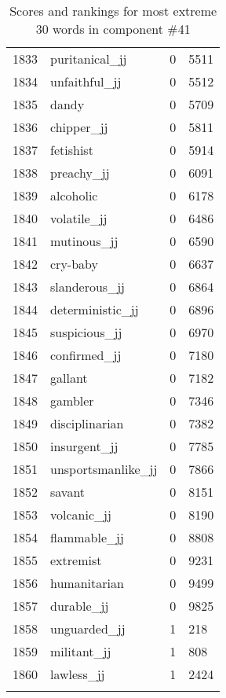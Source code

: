 \begin{longtable}[!htbp]{| rlr@{.}l |}
    1833 & puritanical\_jj & 0 & 5511 \\
    1834 & unfaithful\_jj & 0 & 5512 \\
    1835 & dandy & 0 & 5709 \\
    1836 & chipper\_jj & 0 & 5811 \\
    1837 & fetishist & 0 & 5914 \\
    1838 & preachy\_jj & 0 & 6091 \\
    1839 & alcoholic & 0 & 6178 \\
    1840 & volatile\_jj & 0 & 6486 \\
    1841 & mutinous\_jj & 0 & 6590 \\
    1842 & cry-baby & 0 & 6637 \\
    1843 & slanderous\_jj & 0 & 6864 \\
    1844 & deterministic\_jj & 0 & 6896 \\
    1845 & suspicious\_jj & 0 & 6970 \\
    1846 & confirmed\_jj & 0 & 7180 \\
    1847 & gallant & 0 & 7182 \\
    1848 & gambler & 0 & 7346 \\
    1849 & disciplinarian & 0 & 7382 \\
    1850 & insurgent\_jj & 0 & 7785 \\
    1851 & unsportsmanlike\_jj & 0 & 7866 \\
    1852 & savant & 0 & 8151 \\
    1853 & volcanic\_jj & 0 & 8190 \\
    1854 & flammable\_jj & 0 & 8808 \\
    1855 & extremist & 0 & 9231 \\
    1856 & humanitarian & 0 & 9499 \\
    1857 & durable\_jj & 0 & 9825 \\
    1858 & unguarded\_jj & 1 & 218 \\
    1859 & militant\_jj & 1 & 808 \\
    1860 & lawless\_jj & 1 & 2424 \\
    \hline
    \caption{Scores and rankings for most extreme 30 words in component \#41} \\
\end{longtable}

